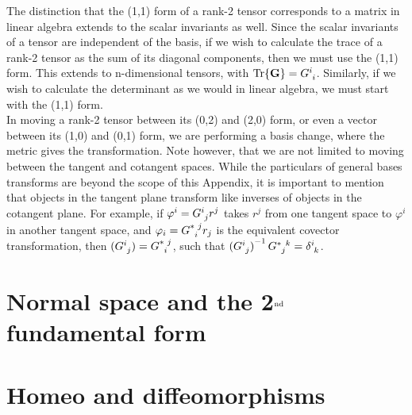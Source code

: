 \begin{appendices}
The distinction that the (1,1) form of a rank-2 tensor corresponds to a matrix in linear algebra extends to the scalar invariants as well.
Since the scalar invariants of a tensor are independent of the basis, if we wish to calculate the trace of a rank-2 tensor as the sum of its diagonal components, then we must use the (1,1) form.
This extends to n-dimensional tensors, with $\textrm{Tr}\{ \mathbf{G} \} = \tensor{G}{^i_i}$.
Similarly, if we wish to calculate the determinant as we would in linear algebra, we must start with the (1,1) form. \\

In moving a rank-2 tensor between its (0,2) and (2,0) form, or even a vector between its (1,0) and (0,1) form, we are performing a basis change, where the metric gives the transformation.
Note however, that we are not limited to moving between the tangent and cotangent spaces.
While the particulars of general bases transforms are beyond the scope of this Appendix, it is important to mention that objects in the tangent plane transform like inverses of objects in the cotangent plane.
For example, if $\varphi^i = \tensor{G}{^i_j}r^j$ takes $r^j$ from one tangent space to $\varphi^i$ in another tangent space, and $\varphi_i = \tensor{G}{^*_i^j}r_j$ is the equivalent covector transformation, then $(\tensor{G}{^i_j}) = \tensor{G}{^*_i^j}$, such that ${(\tensor{G}{^i_j})}^{-1}\,\tensor{G}{^*_j^k} = \tensor{\delta}{^i_k}$.




\section{Normal space and the 2$^{\rm nd}$ fundamental form}

\section{Homeo and diffeomorphisms}

\end{appendices}
